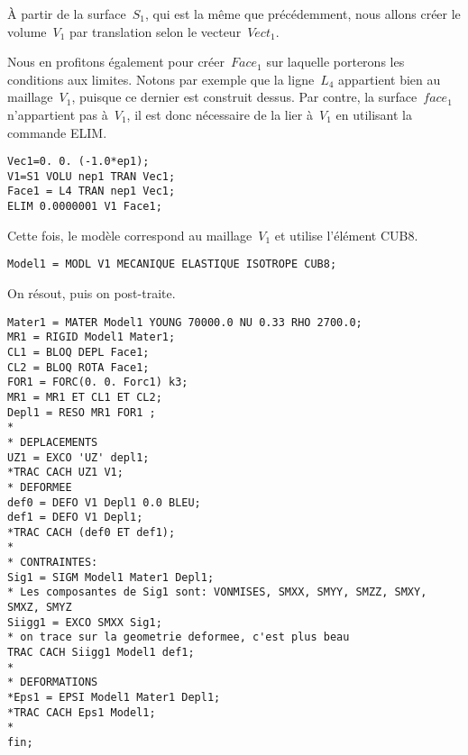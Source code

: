 À partir de la surface~$S_1$, qui est la même que précédemment, nous allons créer le volume~$V_1$ par translation selon le vecteur~$Vect_1$.

Nous en profitons également pour créer~$Face_1$ sur laquelle porterons les conditions aux limites. Notons par exemple que la ligne~$L_4$ appartient bien au maillage~$V_1$, puisque ce dernier est construit dessus. Par contre, la surface~$face_1$ n'appartient pas à~$V_1$, il est donc nécessaire de la lier à~$V_1$ en utilisant la commande ELIM.
\begin{lstlisting}[firstnumber=last]
Vec1=0. 0. (-1.0*ep1);
V1=S1 VOLU nep1 TRAN Vec1;
Face1 = L4 TRAN nep1 Vec1;
ELIM 0.0000001 V1 Face1;
\end{lstlisting}

Cette fois, le modèle correspond au maillage~$V_1$ et utilise l'élément CUB8.
\begin{lstlisting}[firstnumber=last]
Model1 = MODL V1 MECANIQUE ELASTIQUE ISOTROPE CUB8;
\end{lstlisting}

On résout, puis on post-traite.
\begin{lstlisting}[firstnumber=last]
Mater1 = MATER Model1 YOUNG 70000.0 NU 0.33 RHO 2700.0;
MR1 = RIGID Model1 Mater1;
CL1 = BLOQ DEPL Face1;
CL2 = BLOQ ROTA Face1;
FOR1 = FORC(0. 0. Forc1) k3;
MR1 = MR1 ET CL1 ET CL2;
Depl1 = RESO MR1 FOR1 ;
*
* DEPLACEMENTS
UZ1 = EXCO 'UZ' depl1;
*TRAC CACH UZ1 V1;
* DEFORMEE
def0 = DEFO V1 Depl1 0.0 BLEU;
def1 = DEFO V1 Depl1;
*TRAC CACH (def0 ET def1);
*
* CONTRAINTES: 
Sig1 = SIGM Model1 Mater1 Depl1;
* Les composantes de Sig1 sont: VONMISES, SMXX, SMYY, SMZZ, SMXY, SMXZ, SMYZ
Siigg1 = EXCO SMXX Sig1;
* on trace sur la geometrie deformee, c'est plus beau
TRAC CACH Siigg1 Model1 def1;
*
* DEFORMATIONS
*Eps1 = EPSI Model1 Mater1 Depl1;
*TRAC CACH Eps1 Model1;
*
fin;
\end{lstlisting}
